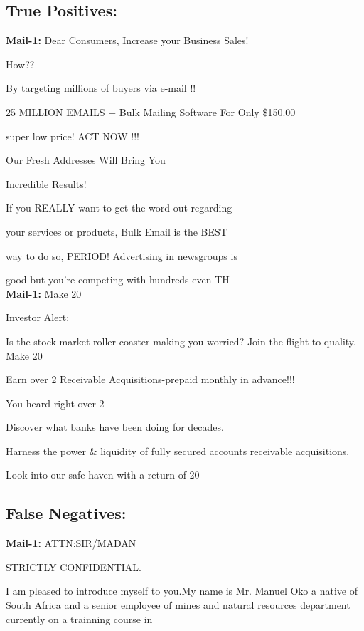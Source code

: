 \documentclass[
	letterpaper, %
	12pt, %
	unnumberedsections, %
	twoside, %
]{LTJournalArticle}
\begin{document}
\begin{appendices}
	\subsection{True Positives:}
	{\ttfamily \tiny
		\noindent\textbf{Mail-1:} Dear Consumers, Increase your Business Sales!

		How??

		By targeting millions of buyers via e-mail !!

		25 MILLION EMAILS + Bulk Mailing Software For Only \$150.00

		super low price! ACT NOW !!!

		Our Fresh Addresses Will Bring You

		Incredible Results!



		If you REALLY want to get the word out regarding

		your services or products, Bulk Email is the BEST

		way to do so, PERIOD! Advertising in newsgroups is

		good but you're competing with hundreds even TH \\

		\noindent\textbf{Mail-1:} Make 20%

		Investor Alert:

		Is the stock market roller coaster making you worried?
		Join the flight to quality. Make 20%

		Earn over 2%
		Receivable Acquisitions-prepaid monthly in advance!!!

		You heard right-over 2%

		Discover what banks have been doing for decades.

		Harness the power \& liquidity of fully secured accounts
		receivable acquisitions.

		Look into our safe haven with a return of 20%


	}

	\subsection{False Negatives:}
	{\ttfamily \tiny
		\noindent\textbf{Mail-1:} ATTN:SIR/MADAN

		STRICTLY CONFIDENTIAL.

		I am pleased to introduce myself  to you.My name is Mr. Manuel Oko a native of South Africa and a senior employee of mines and natural resources department currently on a trainning course in \\

}
\end{appendices}
\end{document}
